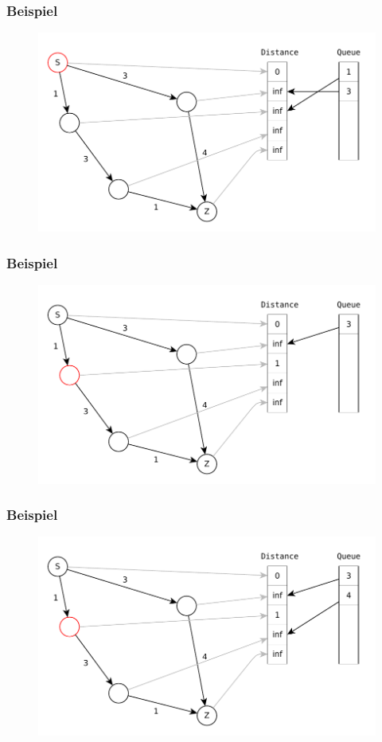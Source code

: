 \begin{frame}
\frametitle{Beispiel}
\begin{figure}
\includegraphics[scale=.8]{dijkstra_graphs/dijkstra_2.pdf}
\end{figure}
\end{frame}

\begin{frame}
\frametitle{Beispiel}
\begin{figure}
\includegraphics[scale=.8]{dijkstra_graphs/dijkstra_3.pdf}
\end{figure}
\end{frame}

\begin{frame}
\frametitle{Beispiel}
\begin{figure}
\includegraphics[scale=.8]{dijkstra_graphs/dijkstra_4.pdf}
\end{figure}
\end{frame}

